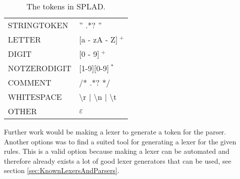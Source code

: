 \begin{table}[H]
\begin{tabular}{|l|l|}
\hline
STRINGTOKEN & '' .*? '' \\
LETTER & [a - zA - Z]$~^+$\\
DIGIT & [0 - 9]$~^+$\\
NOTZERODIGIT & [1-9][0-9]$~^*$\\
COMMENT& /* .*? */\\
WHITESPACE 		& \textbackslash r | \textbackslash n | \textbackslash t \\
OTHER 			& $\varepsilon$ \\ \hline
\end{tabular}
\caption{The tokens in SPLAD.}
\label{tab:tokens}
\end{table}

Further work would be making a lexer to generate a token for the parser. Another options was to find a suited tool for generating a lexer for the given rules. This is a valid option because making a lexer can be automated and therefore already exists a lot of good lexer generators that can be used, see section \ref{sec:KnownLexersAndParsers}.